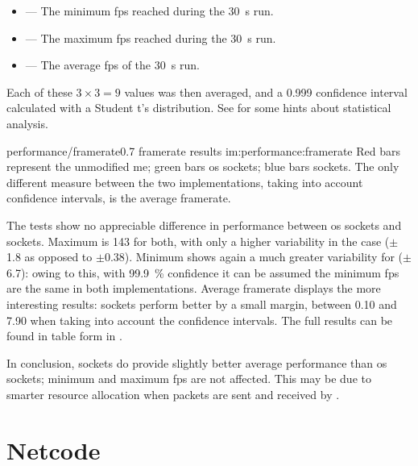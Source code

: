 \begin{itemize}
	\item {} --- The minimum \gls{fps} reached during the \SI{30}{\second} run.
	\item {} --- The maximum \gls{fps} reached during the \SI{30}{\second} run.
	\item {} --- The average \gls{fps} of the \SI{30}{\second} run.
\end{itemize}

\FLOATnoindent Each of these $3\times3=9$ values was then averaged, and a \num{0,999} confidence interval calculated with a Student t's distribution. See  for some hints about statistical analysis.

\begin{image}
	{performance/framerate}{0.7}
	{framerate results}
	{im:performance:framerate}
	{}
	{Red bars represent the unmodified \gls{me}; green bars \gls{os} sockets; blue bars  sockets. The only different measure between the two implementations, taking into account confidence intervals, is the average \gls{framerate}.}
\end{image} %

The tests show no appreciable difference in performance between \gls{os} sockets and  sockets. Maximum is \SI{143}{\fps} for both, with only a higher variability in the  case ($\pm$\SI{1,8}{\fps} as opposed to $\pm$\SI{0,38}{\fps}). Minimum shows again a much greater variability for  ($\pm$\SI{6,7}{\fps}): owing to this, with \SI{99,9}{\percent} confidence it can be assumed the minimum \gls{fps} are the same in both implementations. Average \gls{framerate} displays the more interesting results:  sockets perform better by a small margin, between \SI{0,10}{\fps} and \SI{7,90}{\fps} when taking into account the confidence intervals. The full results can be found in table form in . %

In conclusion,  sockets do provide slightly better average performance than \gls{os} sockets; minimum and maximum \gls{fps} are not affected. This may be due to smarter resource allocation when \glspl{packet} are sent and received by .

\section{Netcode}\label{sc:performance:netcode}

